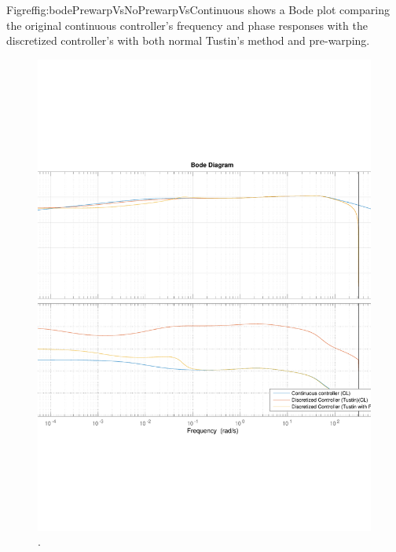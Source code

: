Figref{fig:bodePrewarpVsNoPrewarpVsContinuous} shows a Bode plot comparing the original continuous controller's frequency and phase responses with the discretized controller's with both normal Tustin's method and pre-warping.
% 
\begin{minipage}{\linewidth}
  \begin{minipage}{0.45\linewidth}
    \begin{figure}[H]
      \includegraphics[scale=.50]{figures/prewarpVsNoPrewarpVsContinuousBode.pdf}
      \centering
      \captionsetup{justification=centering}
      .
      \label{fig:bodePrewarpVsNoPrewarpVsContinuous}
    \end{figure}\vspace{-5mm}

\end{minipage}
\end{minipage}
